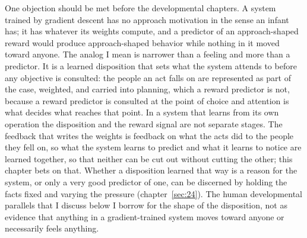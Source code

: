 One objection should be met before the developmental chapters. A system trained by gradient descent has no approach motivation in the sense an infant has; it has whatever its weights compute, and a predictor of an approach-shaped reward would produce approach-shaped behavior while nothing in it moved toward anyone. The analog I mean is narrower than a feeling and more than a predictor. It is a learned disposition that sets what the system attends to before any objective is consulted: the people an act falls on are represented as part of the case, weighted, and carried into planning, which a reward predictor is not, because a reward predictor is consulted at the point of choice and attention is what decides what reaches that point. In a system that learns from its own operation the disposition and the reward signal are not separate stages. The feedback that writes the weights is feedback on what the acts did to the people they fell on, so what the system learns to predict and what it learns to notice are learned together, so that neither can be cut out without cutting the other; this chapter bets on that. Whether a disposition learned that way is a reason for the system, or only a very good predictor of one, can be discerned by holding the facts fixed and varying the pressure (chapter~\ref{sec:24}). The human developmental parallels that I discuss below I borrow for the shape of the disposition, not as evidence that anything in a gradient-trained system moves toward anyone or necessarily feels anything.

